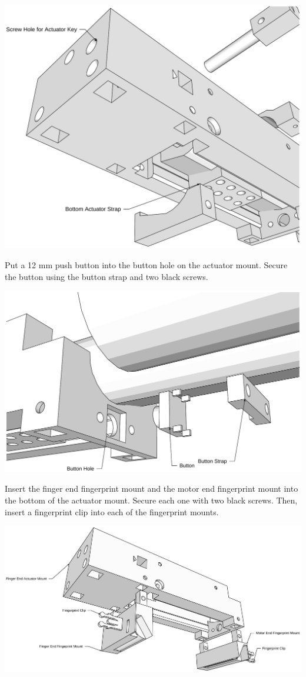 \documentclass[letterpaper,10pt,english]{sphinxmanual}
\begin{document}
\includegraphics{FingerEndActuatorMountBottom.pdf}

Put a 12 mm push button into the button hole on the actuator mount. Secure the button using the button strap and two black screws.

\includegraphics{ButtonInstallation.pdf}

Insert the finger end fingerprint mount and the motor end fingerprint mount into the bottom of the actuator mount. Secure each one with two black screws. Then, insert a fingerprint clip into each of the fingerprint mounts.

\includegraphics{FingerprintMountInstallation.pdf}
\end{document}
